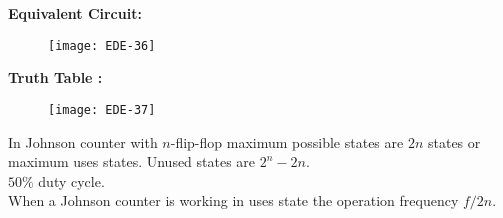\begin{enumerate}
\textbf { Equivalent Circuit: }
\begin{figure}[H]
	\centering
	\texttt{[image: EDE-36]}
\end{figure}
\textbf { Truth Table : }
\begin{figure}[H]
	\centering
	\texttt{[image: EDE-37]}
\end{figure}
In Johnson counter with $n$-flip-flop maximum possible states are $2 n$ states or maximum uses states. Unused states are $2^{n}-2 n$.\\
$50 \%$ duty cycle.\\
When a Johnson counter is working in uses state the operation frequency $f / 2 n$.\\
 \end{enumerate}
